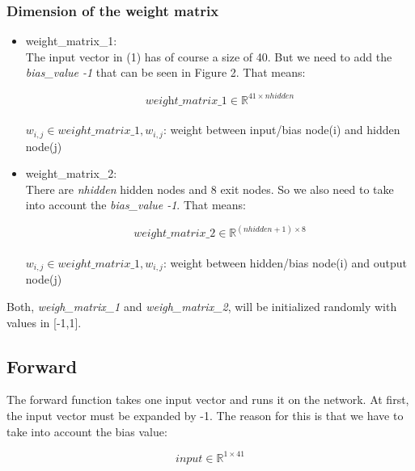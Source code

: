 \documentclass[10pt,a4paper]{article}
\begin{document}
	\subsubsection{Dimension of the weight matrix}			%
		\begin{itemize}
		\item weight\_matrix\_1: \\
		The input vector in (1) has of course a size of 40. But we need to add the \textit{bias\_value -1} that can be seen in Figure 2. That means: \\ 
		\begin{center}
			\begin{equation}
			 \textit{weight\_matrix\_1} \in \mathbb{R}^{41 \times nhidden} 
			\end{equation} 
			\\
			 $w_{i,j} \in weight\_matrix\_1, w_{i,j}$: weight between input/bias node(i) and hidden node(j) 
		\end{center}
		\item weight\_matrix\_2: \\
		There are \textit{nhidden} hidden nodes and 8 exit nodes. So we also need to take into account the \textit{bias\_value -1}. That means: \\
		\begin{center}
			\begin{equation}
			\textit{weight\_matrix\_2} \in \mathbb{R}^{(nhidden+1) \times 8} 
			\end{equation}
			\\
			$w_{i,j} \in weight\_matrix\_1, w_{i,j}$: weight between hidden/bias node(i) and output node(j)  
		\end{center}
	\end{itemize} 
	Both, \textit{weigh\_matrix\_1} and \textit{weigh\_matrix\_2}, will be initialized randomly with values in [-1,1].
	
	\subsection{Forward}								%
	The forward function takes one input vector and runs it on the network. At first, the input vector must be expanded by -1. The reason for this is that we have to take into account the bias value:	
	\begin{center}
		\begin{equation}
		\textit{input} \in \mathbb{R}^{1\times 41} 
		\end{equation} 
	\end{center}
\end{document}
